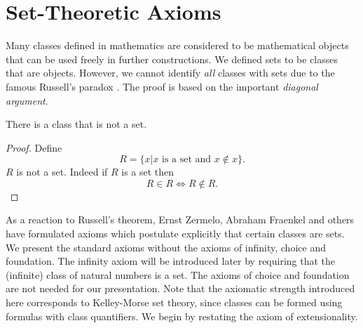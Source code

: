 \documentclass{article}
\begin{document}
\section{Set-Theoretic Axioms}

Many classes defined in mathematics are considered to be
mathematical objects that can be used freely in further constructions.
We defined sets to be classes that are objects. However, we cannot
identify {\em all} classes with sets due to the famous 
Russell's paradox \cite{Russell}.
The proof is based on the important {\em diagonal argument}.

\begin{forthel}

\begin{theorem}[Russell]
There is a class that is not a set.
\end{theorem}
\begin{proof}
Define $$R = \{x |\text{$x$ is a set and $x \notin x$}\}.$$
$R$ is not a set.
Indeed if $R$ is a set then $$R \in R \iff R \notin R.$$
\end{proof}
\end{forthel}

As a reaction to Russell's theorem, Ernst Zermelo, Abraham
Fraenkel and others have formulated axioms which 
postulate explicitly that certain classes are sets. We
present the standard axioms without
the axioms of infinity, choice and foundation. The infinity
axiom will be introduced later by requiring that the 
(infinite) class
of natural numbers is a set. The axioms of choice 
and foundation are not needed for our presentation.
Note that the axiomatic strength introduced here corresponds
to Kelley-Morse set theory, since classes can be formed using
formulas with class quantifiers.
We begin by restating
the axiom of extensionality.
\end{document}
